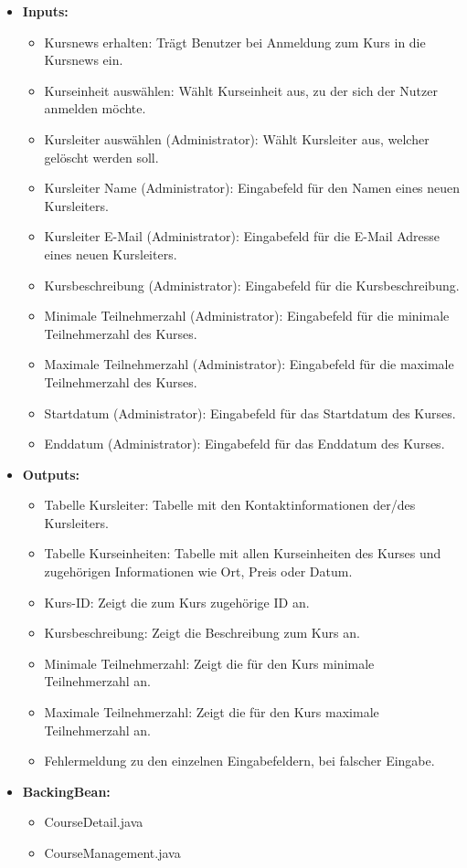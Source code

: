 \begin{itemize}
\begin{itemize}
							\end{itemize}
						\item \textbf{Inputs:}
							\begin{itemize}
								\item Kursnews erhalten: Trägt Benutzer bei Anmeldung zum Kurs in die Kursnews ein.
								\item Kurseinheit auswählen: Wählt Kurseinheit aus, zu der sich der Nutzer anmelden möchte.
								\item Kursleiter auswählen (Administrator): Wählt Kursleiter aus, welcher gelöscht werden soll.
								\item Kursleiter Name (Administrator): Eingabefeld für den Namen eines neuen Kursleiters.
								\item Kursleiter E-Mail (Administrator): Eingabefeld für die E-Mail Adresse eines neuen Kursleiters.
								\item Kursbeschreibung (Administrator): Eingabefeld für die Kursbeschreibung.
								\item Minimale Teilnehmerzahl (Administrator): Eingabefeld für die minimale Teilnehmerzahl des Kurses.
								\item Maximale Teilnehmerzahl (Administrator): Eingabefeld für die maximale Teilnehmerzahl des Kurses.
								\item Startdatum (Administrator): Eingabefeld für das Startdatum des Kurses.
								\item Enddatum (Administrator): Eingabefeld für das Enddatum des Kurses.
							\end{itemize}
						\item \textbf{Outputs:}
							\begin{itemize}
								\item Tabelle Kursleiter: Tabelle mit den Kontaktinformationen der/des Kursleiters.
								\item Tabelle Kurseinheiten: Tabelle mit allen Kurseinheiten des Kurses und zugehörigen Informationen wie Ort, Preis oder Datum.
								\item Kurs-ID: Zeigt die zum Kurs zugehörige ID an.
								\item Kursbeschreibung: Zeigt die Beschreibung zum Kurs an.
								\item Minimale Teilnehmerzahl: Zeigt die für den Kurs minimale Teilnehmerzahl an.
								\item Maximale Teilnehmerzahl: Zeigt die für den Kurs maximale Teilnehmerzahl an.
								\item Fehlermeldung zu den einzelnen Eingabefeldern, bei falscher Eingabe.
							\end{itemize}
						\item \textbf{BackingBean:}
							\begin{itemize}
								\item CourseDetail.java
								\item CourseManagement.java
							\end{itemize}
					\end{itemize}
		

